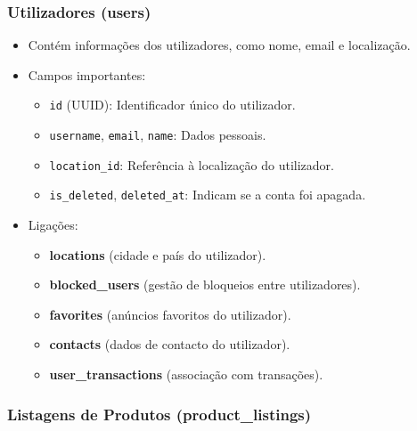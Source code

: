\documentclass[a4paper, 12pt]{article} %
\begin{document}
\subsubsection{\textbf{Utilizadores (users)}}

\begin{itemize}
	\item Contém informações dos utilizadores, como nome, email e localização.
	\item Campos importantes:
	\begin{itemize}
		\item \verb|id| (UUID): Identificador único do utilizador.
		\item \verb|username|, \verb|email|, \verb|name|: Dados pessoais.
		\item \verb|location_id|: Referência à localização do utilizador.
		\item \verb|is_deleted|, \verb|deleted_at|: Indicam se a conta foi apagada.
	\end{itemize}
	\item Ligações:
	\begin{itemize}
		\item \textbf{locations} (cidade e país do utilizador).
		\item \textbf{blocked\_users} (gestão de bloqueios entre utilizadores).
		\item \textbf{favorites} (anúncios favoritos do utilizador).
		\item \textbf{contacts} (dados de contacto do utilizador).
		\item \textbf{user\_transactions} (associação com transações).
	\end{itemize}
\end{itemize}

\subsubsection{\textbf{Listagens de Produtos (product\_listings)}}
\end{document}
